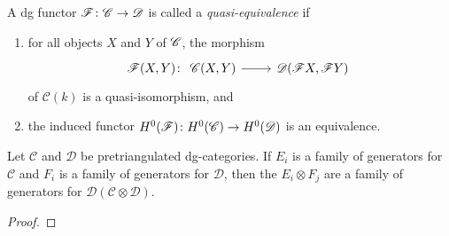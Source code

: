 \documentclass[dissertation.tex]{subfiles}
\begin{document}
\begin{defn}
  A dg functor $\mathscr{F} \colon \mathscr{C} \rightarrow \mathscr{D}$ is called a {\it quasi-equivalence} if 
  \begin{enumerate}
  \item
    for all objects $X$ and $Y$ of $\mathscr{C}$, the morphism
    $$\mathscr{F}(X,Y) \colon
    \begin{tikzcd}
      \CC(X,Y) \arrow{r} & \D(\mathscr{F}X,\mathscr{F}Y)
    \end{tikzcd}$$
    of $\mathcal{C}(k)$ is a quasi-isomorphism, and
  \item
    the induced functor $H^0(\mathscr{F}) \colon H^0(\mathscr{C}) \rightarrow H^0(\mathscr{D})$ is an equivalence.
  \end{enumerate}
\end{defn}




\begin{thm}
  Let $\mathscr{C}$ and $\mathscr{D}$ be pretriangulated dg-categories.
  If $E_i$ is a family of generators for $\mathscr{C}$ and $F_i$ is a family of generators for $\mathscr{D}$, then the $E_i \otimes F_j$ are a family of generators for $\mathcal{D}\left(\mathscr{C} \otimes \mathscr{D}\right)$.
  
  \begin{proof}
    
  \end{proof}
\end{thm}
\end{document}
